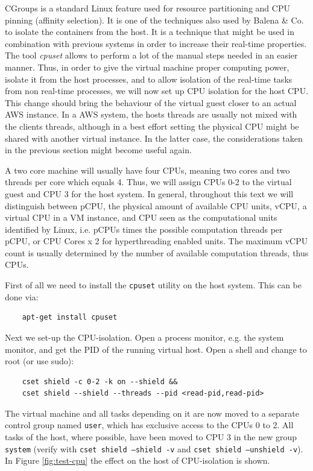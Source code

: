\documentclass[]{scrartcl}
\begin{document}
CGroups is a standard Linux feature used for resource partitioning and CPU pinning (affinity selection). It is one of the techniques also used by Balena \& Co. to isolate the containers from the host. 
It is a technique that might be used in combination with previous systems in order to increase their real-time properties. The tool \textit{cpuset} allows to perform a lot of the manual steps needed in an easier manner. 
Thus, in order to give the virtual machine proper computing power, isolate it from the host processes, and to allow isolation of the real-time tasks from non real-time processes, we will now set up CPU isolation for the host CPU.
This change should bring the behaviour of the virtual guest closer to an actual AWS instance. In a AWS system, the hosts threads are usually not mixed with the clients threads, although in a best effort setting the physical CPU might be shared with another virtual instance.
In the latter case, the considerations taken in the previous section might become useful again.

A two core machine will usually have four CPUs, meaning two cores and two threads per core which equals 4. Thus, we will assign CPUs 0-2 to the virtual guest and CPU 3 for the host system. In general, throughout this text we will distinguish between pCPU, the physical amount of available CPU units, vCPU, a virtual CPU in a VM instance, and CPU seen as the computational units identified by Linux, i.e. pCPUs times the possible computation threads per pCPU, or CPU Cores x 2 for hyperthreading enabled units. The maximum vCPU count is usually determined by the number of available computation threads, thus CPUs.

First of all we need to install the \texttt{cpuset} utility on the host system. This can be done via:

\begin{verbatim}
	apt-get install cpuset
\end{verbatim}

Next we set-up the CPU-isolation. Open a process monitor, e.g. the system monitor, and get the PID of the running virtual host. %
Open a shell and change to root (or use sudo):

\begin{verbatim}
	cset shield -c 0-2 -k on --shield &&
	cset shield --shield --threads --pid <read-pid,read-pid>
\end{verbatim}

The virtual machine and all tasks depending on it are now moved to a separate control group named \texttt{user}, which has exclusive access to the CPUs 0 to 2. 
All tasks of the host, where possible, have been moved to CPU 3 in the new group \texttt{system} (verify with \texttt{cset shield --shield -v} and \texttt{cset shield --unshield -v}). In Figure \ref{fig:test-cpu} the effect on the host of CPU-isolation is shown.
\end{document}
